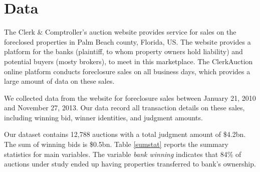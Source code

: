 \documentclass[11pt,twopage]{article}
\begin{document}
\section{Data}
\label{sec:data}

The Clerk \& Comptroller's auction website provides service for sales on
the foreclosed properties in Palm Beach county, Florida, US. The
website provides a platform for the banks (plaintiff, to whom property
owners hold liability) and potential buyers (mosty brokers), to
meet in this marketplace. The ClerkAuction online platform conducts
foreclosure sales on all business days, which provides a large amount of data on 
these sales.

We collected data from the website for foreclosure sales between
January 21, 2010
and November 27, 2013. Our data record all transaction details on these
sales, including winning bid, winner identities, and judgment
amounts.%



Our dataset contains 12,788 auctions with a total judgment amount
of \$4.2bn. The sum of winning bids is \$0.5bn.
Table \ref{sumstat} reports the summary statistics for
main variables.  The variable \textit{bank winning} indicates
that 84\% of auctions under study ended up having properties
transferred to bank's ownership. 

\end{document}
